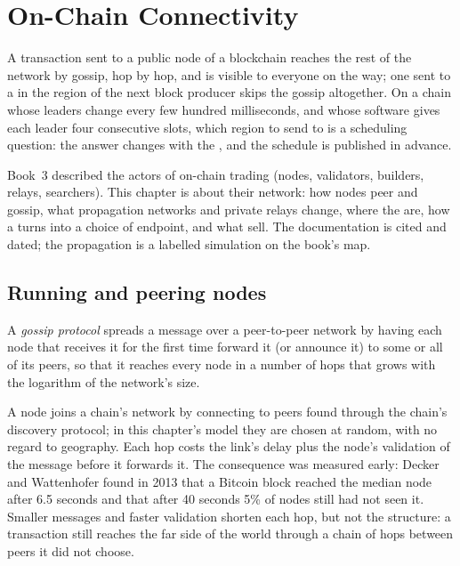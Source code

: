 \chapter{On-Chain Connectivity}\label{ch:nw:on-chain-connectivity}

A transaction sent to a public node of a blockchain reaches the rest of the network by gossip, hop by hop, and is visible to everyone on the
way; one sent to a  in the region of the next block producer skips the gossip altogether. On a chain whose leaders change every
few hundred milliseconds, and whose software gives each leader four consecutive slots, which region to send to is a scheduling question: the
answer changes with the , and the schedule is published in advance.

Book~3 described the actors of on-chain trading (nodes, validators, builders, relays, searchers). This chapter is about their network: how
nodes peer and gossip, what propagation networks and private relays change, where the  are, how a  turns into a
choice of endpoint, and what  sell. The documentation is cited and dated; the propagation is a labelled simulation on
the book's map.

\section{Running and peering nodes}

\begin{definition}\label{def:nw:on-chain-connectivity:gossip}
A \emph{gossip protocol} spreads a message over a peer-to-peer network by having each node that receives it for the first
time forward it (or announce it) to some or all of its peers, so that it reaches every node in a number of hops that grows with the logarithm of
the network's size.
\end{definition}

A node joins a chain's network by connecting to peers found through the chain's discovery protocol; in this chapter's model they are chosen at
random, with no regard to geography. Each hop costs the link's delay plus the node's validation of the message before it forwards it. The consequence was measured early:
Decker and Wattenhofer found in 2013 that a Bitcoin block reached the median node after 6.5 seconds and that after 40 seconds 5\% of nodes still
had not seen it. Smaller messages and faster validation shorten each hop, but not the structure: a transaction still reaches the far side of
the world through a chain of hops between peers it did not choose.

